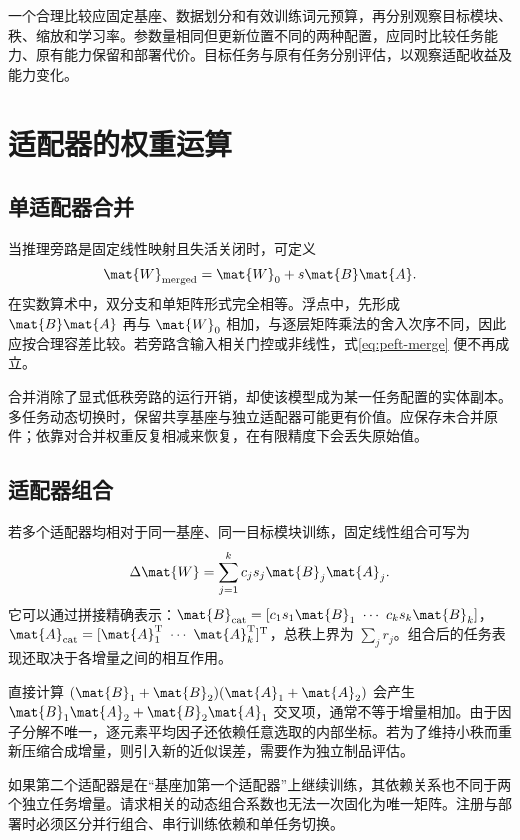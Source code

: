 \documentclass[../textbook.tex]{subfiles}
\begin{document}
一个合理比较应固定基座、数据划分和有效训练词元预算，再分别观察目标模块、秩、缩放和学习率。参数量相同但更新位置不同的两种配置，应同时比较任务能力、原有能力保留和部署代价。目标任务与原有任务分别评估，以观察适配收益及能力变化。

\section{适配器的权重运算}

\subsection{单适配器合并}
当推理旁路是固定线性映射且失活关闭时，可定义
\begin{equation}
\mat{W}_{\mathrm{merged}}=\mat{W}_0+s\mat{B}\mat{A}.
\label{eq:peft-merge}
\end{equation}
在实数算术中，双分支和单矩阵形式完全相等。浮点中，先形成 $\mat{B}\mat{A}$ 再与 $\mat{W}_0$ 相加，与逐层矩阵乘法的舍入次序不同，因此应按合理容差比较。若旁路含输入相关门控或非线性，式\eqref{eq:peft-merge} 便不再成立。

合并消除了显式低秩旁路的运行开销，却使该模型成为某一任务配置的实体副本。多任务动态切换时，保留共享基座与独立适配器可能更有价值。应保存未合并原件；依靠对合并权重反复相减来恢复，在有限精度下会丢失原始值。

\subsection{适配器组合}
若多个适配器均相对于同一基座、同一目标模块训练，固定线性组合可写为
\begin{equation}
\Delta \mat{W}=\sum_{j=1}^{k}c_js_j\mat{B}_j\mat{A}_j.
\end{equation}
它可以通过拼接精确表示：$\mat{B}_{\mathrm{cat}}=[c_1s_1\mat{B}_1\ \cdots\ c_ks_k\mat{B}_k]$，$\mat{A}_{\mathrm{cat}}=[\mat{A}_1^{\mathrm{T}}\ \cdots\ \mat{A}_k^{\mathrm{T}}]^{\mathrm{T}}$，总秩上界为 $\sum_jr_j$。组合后的任务表现还取决于各增量之间的相互作用。

直接计算 $(\mat{B}_1+\mat{B}_2)(\mat{A}_1+\mat{A}_2)$ 会产生 $\mat{B}_1\mat{A}_2+\mat{B}_2\mat{A}_1$ 交叉项，通常不等于增量相加。由于因子分解不唯一，逐元素平均因子还依赖任意选取的内部坐标。若为了维持小秩而重新压缩合成增量，则引入新的近似误差，需要作为独立制品评估。

如果第二个适配器是在“基座加第一个适配器”上继续训练，其依赖关系也不同于两个独立任务增量。请求相关的动态组合系数也无法一次固化为唯一矩阵。注册与部署时必须区分并行组合、串行训练依赖和单任务切换。
\end{document}
